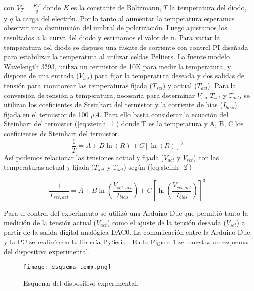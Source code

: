 \documentclass[a4paper, 11pt]{article}
\begin{document}
con $V_T=\frac{KT}{q}$ donde $K$ es la constante de Boltzmann, $T$ la temperatura del diodo, y $q$ la carga del electrón. Por lo tanto al aumentar la temperatura esperamos observar una disminución del umbral de polarización. Luego ajustamos los resultados a la curva del diodo y estimamos el valor de n.
Para variar la temperatura del diodo se dispuso una fuente de corriente con control PI diseñada para estabilizar la temperatura al utilizar celdas Peltiers. La fuente modelo Wavelength 3293, utiliza un termistor de 10K para medir la temperatura, y dispone de una entrada ($V_{set}$) para fijar la temperatura deseada y dos salidas de tensión para monitorear las temperaturas fijada ($T_{set}$) y actual ($T_{act}$). Para la conversión de tensión a temperatura, necesaria para determinar $V_{set}$ $T_{set}$ y $T_{act}$, se utilizan los coeficientes de Steinhart del termistor y la corriente de bias ($I_{bias}$) fijada en el termistor  de 100  ${\mu A}$. Para ello basta considerar la ecuación del Steinhart del termistor (\ref{eq:steinh_1}) donde T es la temperatura y A, B, C los coeficientes de Steinhart del termistor.
\begin{equation}\label{eq:steinh_1}
\frac{1}{T} = A + B\ln(R)+ C[\ln(R)]^3
\end{equation}
Así podemos relacionar las tensiones actual y fijada ($V_{act}$ y $V_{set}$) con las temperaturas actual y fijada ($T_{act}$ y $T_{set}$) según (\ref{eq:steinh_2})

\begin{equation}\label{eq:steinh_2}
\frac{1}{T_{set,act}} = A + B\ln(\frac{V_{set,act}}{I_{bias}})+ C[\ln(\frac{V_{set,act}}{I_{bias}})]^3
\end{equation}

Para el control del experimento se utilizó una Arduino Due que permitió tanto la medición de la tensión actual ($V_{act}$) como el ajuste de la tensión deseada ($V_{set}$) a partir de la salida digital-analógica DAC0.  La comunicación entre la Arduino Due y la PC se realizó con la librería PySerial. En la Figura \ref{fig:esquema_temp} se muestra un esquema del dispositivo experimental.

\begin{figure} [H]
\centering
\texttt{[image: esquema\_temp.png]}
\caption{ Esquema del dispositivo experimental. \label{fig:esquema_temp}}
\end{figure} 
\end{document}
